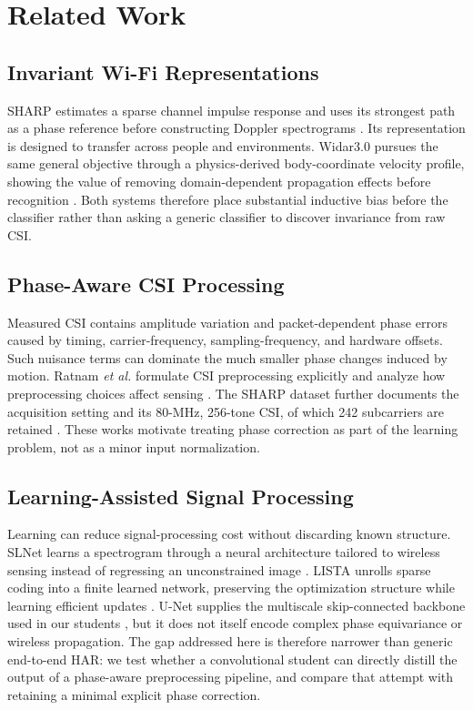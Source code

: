 \section{Related Work}
\label{sec:related}

\subsection{Invariant Wi-Fi Representations}

SHARP estimates a sparse channel impulse response and uses its strongest path as
a phase reference before constructing Doppler spectrograms
\cite{meneghello2023sharp}. Its representation is designed to transfer across
people and environments. Widar3.0 pursues the same general objective through a
physics-derived body-coordinate velocity profile, showing the value of removing
domain-dependent propagation effects before recognition
\cite{zheng2019widar}. Both systems therefore place substantial inductive bias
before the classifier rather than asking a generic classifier to discover
invariance from raw CSI.

\subsection{Phase-Aware CSI Processing}

Measured CSI contains amplitude variation and packet-dependent phase errors
caused by timing, carrier-frequency, sampling-frequency, and hardware offsets.
Such nuisance terms can dominate the much smaller phase changes induced by
motion. Ratnam \emph{et al.} formulate CSI preprocessing explicitly and analyze
how preprocessing choices affect sensing \cite{ratnam2024optimal}. The SHARP
dataset further documents the acquisition setting and its 80-MHz, 256-tone CSI,
of which 242 subcarriers are retained \cite{meneghello2023dataset}. These works
motivate treating phase correction as part of the learning problem, not as a
minor input normalization.

\subsection{Learning-Assisted Signal Processing}

Learning can reduce signal-processing cost without discarding known structure.
SLNet learns a spectrogram through a neural architecture tailored to wireless
sensing instead of regressing an unconstrained image
\cite{yang2023slnet}. LISTA unrolls sparse coding into a finite learned network,
preserving the optimization structure while learning efficient updates
\cite{gregor2010lista}. U-Net supplies the multiscale skip-connected backbone
used in our students \cite{ronneberger2015unet}, but it does not itself encode
complex phase equivariance or wireless propagation. The gap addressed here is
therefore narrower than generic end-to-end HAR: we test whether a convolutional
student can directly distill the output of a phase-aware preprocessing pipeline,
and compare that attempt with retaining a minimal explicit phase correction.
